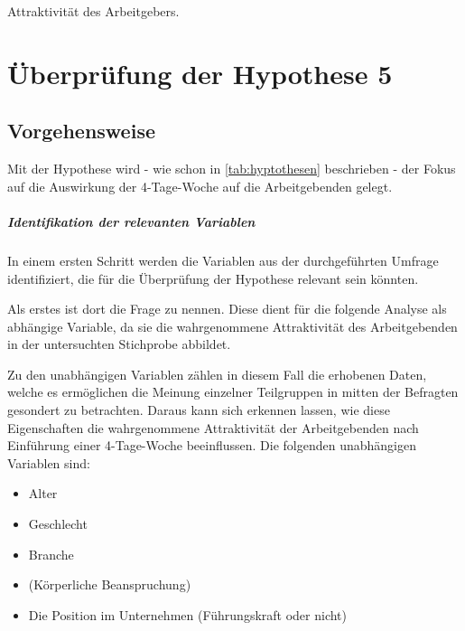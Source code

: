 Attraktivität des Arbeitgebers. 

\chapter{Überprüfung der Hypothese 5}
\label{chap:hypothese5}


\section{Vorgehensweise}
Mit der Hypothese  wird - wie schon in \ref{tab:hyptothesen} beschrieben - der 
Fokus auf die Auswirkung der 4-Tage-Woche auf die Arbeitgebenden gelegt. 

\paragraph{Identifikation der relevanten Variablen}
In einem ersten Schritt werden die Variablen aus der durchgeführten Umfrage identifiziert, die für die 
Überprüfung der Hypothese relevant sein könnten.

Als erstes ist dort die Frage  zu nennen. Diese dient für die folgende Analyse als abhängige 
Variable, da sie die wahrgenommene Attraktivität des Arbeitgebenden in der untersuchten Stichprobe abbildet.

Zu den unabhängigen Variablen zählen in diesem Fall die erhobenen Daten, welche es ermöglichen die Meinung 
einzelner Teilgruppen in mitten der Befragten gesondert zu betrachten. Daraus kann sich erkennen lassen, wie diese
Eigenschaften die wahrgenommene Attraktivität der Arbeitgebenden nach Einführung einer 4-Tage-Woche beeinflussen.
Die folgenden unabhängigen Variablen sind:
\begin{itemize}
  \item Alter
  \item Geschlecht
  \item Branche
  \item (Körperliche Beanspruchung)
  \item Die Position im Unternehmen (Führungskraft oder nicht)
\end{itemize}


